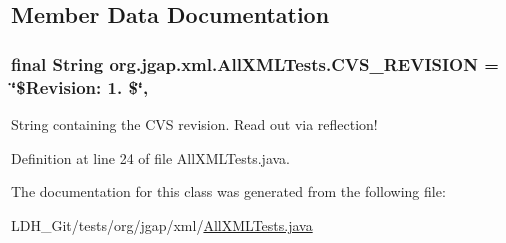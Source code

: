 \subsection{Member Data Documentation}
\hypertarget{classorg_1_1jgap_1_1xml_1_1_all_x_m_l_tests_a42f072aaae2d500d6aebbc732afaf065}{
\subsubsection[{C\-V\-S\-\_\-\-R\-E\-V\-I\-S\-I\-O\-N}]{\setlength{\rightskip}{0pt plus 5cm}final String org.\-jgap.\-xml.\-All\-X\-M\-L\-Tests.\-C\-V\-S\-\_\-\-R\-E\-V\-I\-S\-I\-O\-N = \char`\"{}\$Revision\-: 1. \$\char`\"{}\hspace{0.3cm}{\ttfamily [static]}, {\ttfamily [private]}}}\label{classorg_1_1jgap_1_1xml_1_1_all_x_m_l_tests_a42f072aaae2d500d6aebbc732afaf065}
String containing the C\-V\-S revision. Read out via reflection! 

Definition at line 24 of file All\-X\-M\-L\-Tests.\-java.



The documentation for this class was generated from the following file\-:\begin{DoxyCompactItemize}
\item 
L\-D\-H\-\_\-\-Git/tests/org/jgap/xml/\hyperlink{_all_x_m_l_tests_8java}{All\-X\-M\-L\-Tests.\-java}\end{DoxyCompactItemize}
